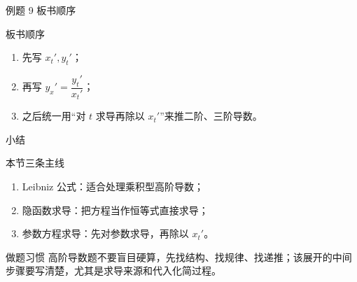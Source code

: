﻿\documentclass[aspectratio=169,10pt]{ctexbeamer}
\begin{document}
\begin{frame}[t]{例题 9 板书顺序}
\small
\begin{block}{板书顺序}
\begin{enumerate}
  \item 先写 $x_t',y_t'$；
  \item 再写 $y_x'=\dfrac{y_t'}{x_t'}$；
  \item 之后统一用“对 $t$ 求导再除以 $x_t'$”来推二阶、三阶导数。
\end{enumerate}
\end{block}
\end{frame}

\begin{frame}[t]{小结}
\small
\begin{block}{本节三条主线}
\begin{enumerate}
  \item Leibniz 公式：适合处理乘积型高阶导数；
  \item 隐函数求导：把方程当作恒等式直接求导；
  \item 参数方程求导：先对参数求导，再除以 $x_t'$。
\end{enumerate}
\end{block}

\begin{alertblock}{做题习惯}
高阶导数题不要盲目硬算，先找结构、找规律、找递推；该展开的中间步骤要写清楚，尤其是求导来源和代入化简过程。
\end{alertblock}
\end{frame}
\end{document}
